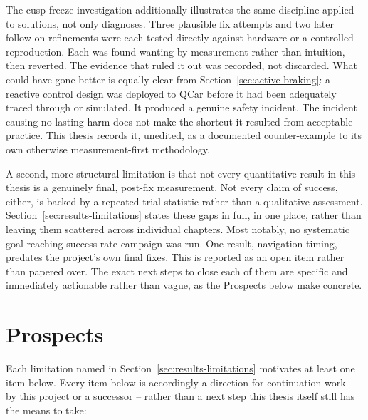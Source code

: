 The cusp-freeze investigation additionally illustrates the same
discipline applied to solutions, not only diagnoses. Three plausible
fix attempts and two later follow-on refinements were each tested
directly against hardware or a controlled reproduction. Each was
found wanting by measurement rather than intuition, then reverted.
The evidence that ruled it out was recorded, not discarded.
What could have gone better is
equally clear from Section~\ref{sec:active-braking}: a reactive
control design was deployed to QCar before it had been
adequately traced through or simulated. It produced a genuine
safety incident. The incident causing no lasting harm does not
make the shortcut it resulted from acceptable practice. This
thesis records it, unedited, as a documented counter-example to its
own otherwise measurement-first methodology.

A second, more structural limitation is that not every quantitative
result in this thesis is a genuinely final, post-fix measurement.
Not every claim of success, either, is backed by a repeated-trial
statistic rather than a qualitative assessment.
Section~\ref{sec:results-limitations} states these gaps in full, in
one place, rather than leaving them scattered across individual
chapters. Most notably, no systematic goal-reaching success-rate
campaign was run. One result, navigation timing, predates
the project's own final fixes. This is reported as an open item rather
than papered over. The exact next steps to close each of them are
specific and immediately actionable rather than vague, as the
Prospects below make concrete.

\section{Prospects}
\label{sec:prospects}

Each limitation named in Section~\ref{sec:results-limitations}
motivates at least one item below. Every item below is accordingly a
direction for continuation work -- by this project or a successor --
rather than a next step this thesis itself still has the means to
take:

